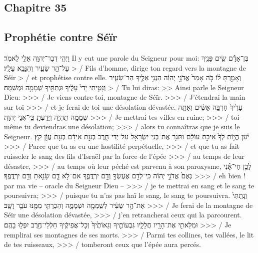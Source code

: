 \begin{paracol}[1]
  \section*{Chapitre 35}
  \subsection*{Prophétie contre Séïr}
  \verset
  {וַיְהִ֥י דְבַר־יְהוָ֖ה אֵלַ֥י לֵאמֹֽר׃}
  {Il y eut une parole du Seigneur pour moi:}
  \verset
  {בֶּן־אָדָ֕ם שִׂ֥ים פָּנֶ֖יךָ עַל־הַ֣ר שֵׂעִ֑יר
    וְהִנָּבֵ֖א עָלָֽיו׃}
  {> / Fils d’homme, dirige ton regard vers la montagne de Séïr
    > / et prophétise contre elle.}
  \verset
  {וְאָמַ֣רְתָּ לּ֗וֹ
    כֹּ֤ה אָמַר֙ אֲדֹנָ֣י יְהוִ֔ה
    הִנְנִ֥י אֵלֶ֖יךָ הַר־שֵׂעִ֑יר
    וְנָטִ֤יתִי יָדִי֙ עָלֶ֔יךָ
    וּנְתַתִּ֖יךָ שְׁמָמָ֥ה וּמְשַׁמָּֽה׃}
  {> / Tu lui diras:
    >> Ainsi parle le Seigneur Dieu:
    >>> / Je viens contre toi, montagne de Séïr.
    >>> / J’étendrai la main sur toi
    >>> / et je ferai de toi une désolation dévastée.}
  \verset
  {עָרֶ֙יךָ֙ חָרְבָּ֣ה אָשִׂ֔ים
    וְאַתָּ֖ה שְׁמָמָ֣ה תִֽהְיֶ֑ה
    וְיָדַעְתָּ֖ כִּֽי־אֲנִ֥י יְהוָֽה׃}
  {>>> / Je mettrai tes villes en ruine;
    >>> / toi-même tu deviendras une désolation;
    >>> / alors tu connaîtras que je suis le Seigneur.}
  \verset
  {יַ֗עַן הֱי֤וֹת לְךָ֙ אֵיבַ֣ת עוֹלָ֔ם
    וַתַּגֵּ֥ר אֶת־בְּנֵֽי־יִשְׂרָאֵ֖ל עַל־יְדֵי־חָ֑רֶב
    בְּעֵ֣ת אֵידָ֔ם
    בְּעֵ֖ת עֲוֹ֥ן קֵֽץ׃}
  {>>> / Parce que tu as eu une hostilité perpétuelle,
    >>> / et que tu as fait ruisseler le sang des fils d’Israël par la force de l’épée
    >>> / au temps de leur désastre,
    >>> / au temps où leur péché est parvenu à son paroxysme,}
  \verset
  {לָכֵ֣ן חַי־אָ֗נִי נְאֻם֙ אֲדֹנָ֣י יְהוִ֔ה
    כִּֽי־לְדָ֥ם אֶעֶשְׂךָ֖ וְדָ֣ם יִרְדֲּפֶ֑ךָ
    אִם־לֹ֥א דָ֛ם שָׂנֵ֖אתָ וְדָ֥ם יִרְדֲּפֶֽךָ׃}
  {>>> / eh bien ! par ma vie – oracle du Seigneur Dieu –
    >>> / je te mettrai en sang et le sang te poursuivra;
    >>> / puisque tu n’as pas haï le sang, le sang te poursuivra.}
  \verset
  {וְנָֽתַתִּי֙ אֶת־הַ֣ר שֵׂעִ֔יר לְשִֽׁמְמָ֖ה וּשְׁמָמָ֑ה
    וְהִכְרַתִּ֥י מִמֶּ֖נּוּ עֹבֵ֥ר וָשָֽׁב׃}
  {>>> / Je ferai de la montagne de Séïr une désolation dévastée,
    >>> / j’en retrancherai ceux qui la parcourent.}
  \verset
  {וּמִלֵּאתִ֥י אֶת־הָרָ֖יו חֲלָלָ֑יו
    גִּבְעוֹתֶ֤יךָ וְגֵאוֹתֶ֙יךָ֙ וְכָל־אֲפִיקֶ֔יךָ
    חַלְלֵי־חֶ֖רֶב יִפְּל֥וּ בָהֶֽם׃}
  {>>> / Je remplirai ses montagnes de ses morts.
    >>> / Parmi tes collines, tes vallées, le lit de tes ruisseaux,
    >>> / tomberont ceux que l’épée aura percés.}
  \verset

\end{paracol}
